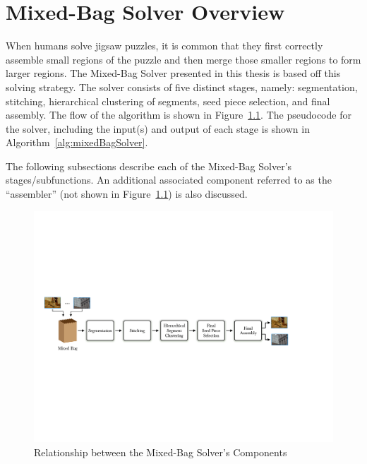 \chapter{Mixed-Bag Solver Overview}\label{chap:mixedBagSolver}

When humans solve jigsaw puzzles, it is common that they first correctly assemble small regions of the puzzle and then merge those smaller regions to form larger regions.  The Mixed-Bag Solver presented in this thesis is based off this solving strategy.  The solver consists of five distinct stages, namely: segmentation, stitching, hierarchical clustering of segments, seed piece selection, and final assembly.  The flow of the algorithm is shown in Figure~\ref{fig:multipuzzleSolverArchitecture}.  The pseudocode for the solver, including the input(s) and output of each stage is shown in Algorithm~\ref{alg:mixedBagSolver}. 

The following subsections describe each of the Mixed-Bag Solver's stages/subfunctions.  An additional associated component referred to as the ``assembler'' (not shown in Figure~\ref{fig:multipuzzleSolverArchitecture}) is also discussed.

\begin{figure}[ht!]
	\centering
		\includegraphics[width=1.0\textwidth]{images/cropped_algorithm_structure_overview.pdf}
	\caption{Relationship between the Mixed-Bag Solver's Components}\label{fig:multipuzzleSolverArchitecture}
\end{figure}

